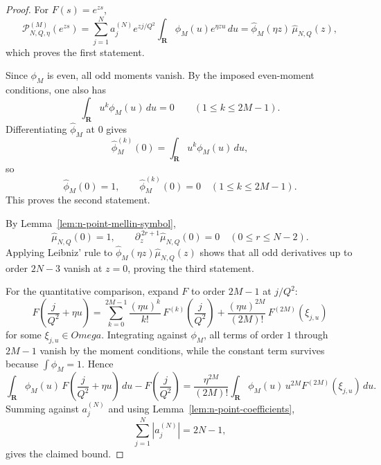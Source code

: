 \documentclass[11pt,a4paper]{amsart}
\def\Omega{Omega}%
\theoremstyle{plain}
\theoremstyle{definition}
\begin{document}
\begin{proof}
For $F(s)=e^{zs}$,
\[
\mathcal P_{N,Q,\eta}^{(M)}(e^{zs})
=
\sum_{j=1}^N a_j^{(N)}e^{zj/Q^2}
\int_{\mathbf R}\phi_M(u)e^{\eta zu}\,du
=
\widehat\phi_M(\eta z)\,\widehat\mu_{N,Q}(z),
\]
which proves the first statement.

Since $\phi_M$ is even, all odd moments vanish. By the imposed even-moment
conditions, one also has
\[
\int_{\mathbf R}u^k\phi_M(u)\,du=0
\qquad (1\le k\le 2M-1).
\]
Differentiating $\widehat\phi_M$ at $0$ gives
\[
\widehat\phi_M^{(k)}(0)=\int_{\mathbf R}u^k\phi_M(u)\,du,
\]
so
\[
\widehat\phi_M(0)=1,
\qquad
\widehat\phi_M^{(k)}(0)=0
\quad (1\le k\le 2M-1).
\]
This proves the second statement.

By Lemma~\ref{lem:n-point-mellin-symbol},
\[
\widehat\mu_{N,Q}(0)=1,
\qquad
\partial_z^{\,2r+1}\widehat\mu_{N,Q}(0)=0
\quad (0\le r\le N-2).
\]
Applying Leibniz' rule to
$\widehat\phi_M(\eta z)\widehat\mu_{N,Q}(z)$ shows that all odd derivatives
up to order $2N-3$ vanish at $z=0$, proving the third statement.

For the quantitative comparison, expand $F$ to order $2M-1$ at $j/Q^2$:
\[
F\!\left(\frac{j}{Q^2}+\eta u\right)
=
\sum_{k=0}^{2M-1}
\frac{(\eta u)^k}{k!}\,
F^{(k)}\!\left(\frac{j}{Q^2}\right)
+
\frac{(\eta u)^{2M}}{(2M)!}\,F^{(2M)}(\xi_{j,u})
\]
for some $\xi_{j,u}\in\Omega$. Integrating against $\phi_M$, all terms of
order $1$ through $2M-1$ vanish by the moment conditions, while the
constant term survives because $\int\phi_M=1$. Hence
\[
\int_{\mathbf R}\phi_M(u)\,
F\!\left(\frac{j}{Q^2}+\eta u\right)\,du
-
F\!\left(\frac{j}{Q^2}\right)
=
\frac{\eta^{2M}}{(2M)!}
\int_{\mathbf R}\phi_M(u)\,u^{2M}F^{(2M)}(\xi_{j,u})\,du.
\]
Summing against $a_j^{(N)}$ and using
Lemma~\ref{lem:n-point-coefficients},
\[
\sum_{j=1}^N |a_j^{(N)}|=2N-1,
\]
gives the claimed bound.
\qedhere
\end{proof}
\end{document}
